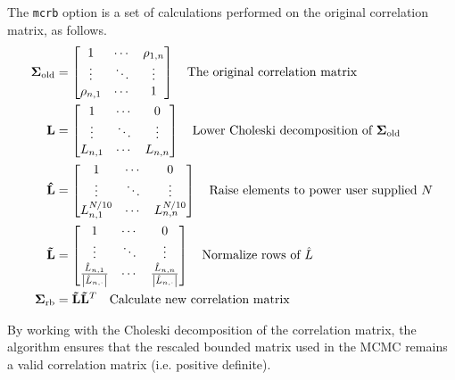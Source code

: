 \documentclass{article}
\begin{document}
The \texttt{mcrb} option is a set of calculations performed
on the original correlation matrix, as follows.
\begin{align*}
  \mathbf{\Sigma_{\text{old}}}&=
  \begin{bmatrix}
    1 & \cdots & \rho_{1,n}\\
    \vdots & \ddots & \vdots\\
    \rho_{n,1} & \cdots & 1
  \end{bmatrix}
  \quad\text{The original correlation matrix}\\
  \mathbf{L}&=\begin{bmatrix}
    1 & \cdots & 0\\
    \vdots & \ddots & \vdots\\
    L_{n,1} & \cdots & L_{n,n}
  \end{bmatrix}
  \quad\text{Lower Choleski decomposition of $ \mathbf{\Sigma_{\text{old}}}$}\\
  \mathbf{\hat{L}}&=\begin{bmatrix}
    1 & \cdots & 0\\
    \vdots & \ddots & \vdots\\
    L_{n,1}^{N/10} & \cdots & L_{n,n}^{N/10}
  \end{bmatrix}
  \quad\text{Raise elements to power user supplied $N$}\\
  \mathbf{\tilde{L}}&=\begin{bmatrix}
    1 & \cdots & 0\\
    \vdots & \ddots & \vdots\\
    \frac{\hat{L}_{n,1}}{\left | \hat{L}_{n,\cdot}\right |} & \cdots &
    \frac{\hat{L}_{n,n}}{\left | \hat{L}_{n,\cdot}\right |}
  \end{bmatrix}
  \quad\text{Normalize rows of $\hat{L}$ }\\
  \mathbf{\Sigma_{\text{rb}}}&=\mathbf{\tilde{L}}\mathbf{\tilde{L}}^T
  \quad\text{Calculate new correlation matrix}
\end{align*}

By working with the Choleski decomposition of the
correlation matrix, the algorithm ensures that the rescaled
bounded matrix used in the MCMC remains a valid correlation
matrix (i.e. positive definite).
\end{document}
